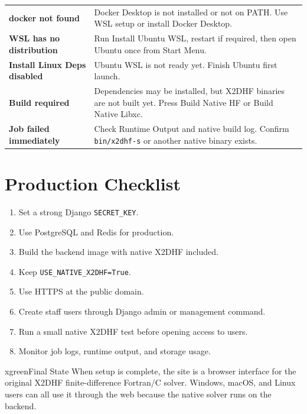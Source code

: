 \documentclass[11pt,a4paper]{article}
\begin{document}
\begin{tabularx}{\textwidth}{>{\bfseries}p{4.5cm}X}
\textcolor{xred}{docker not found} & Docker Desktop is not installed or not on PATH. Use WSL setup or install Docker Desktop. \\
\textcolor{xred}{WSL has no distribution} & Run Install Ubuntu WSL, restart if required, then open Ubuntu once from Start Menu. \\
\textcolor{xred}{Install Linux Deps disabled} & Ubuntu WSL is not ready yet. Finish Ubuntu first launch. \\
\textcolor{xred}{Build required} & Dependencies may be installed, but X2DHF binaries are not built yet. Press Build Native HF or Build Native Libxc. \\
\textcolor{xred}{Job failed immediately} & Check Runtime Output and native build log. Confirm \texttt{bin/x2dhf-s} or another native binary exists. \\
\end{tabularx}

\section{Production Checklist}

\begin{enumerate}[leftmargin=*]
\item Set a strong Django \texttt{SECRET\_KEY}.
\item Use PostgreSQL and Redis for production.
\item Build the backend image with native X2DHF included.
\item Keep \texttt{USE\_NATIVE\_X2DHF=True}.
\item Use HTTPS at the public domain.
\item Create staff users through Django admin or management command.
\item Run a small native X2DHF test before opening access to users.
\item Monitor job logs, runtime output, and storage usage.
\end{enumerate}

\begin{xbox}{xgreen}{Final State}
When setup is complete, the site is a browser interface for the original X2DHF finite-difference Fortran/C solver. Windows, macOS, and Linux users can all use it through the web because the native solver runs on the backend.
\end{xbox}
\end{document}
